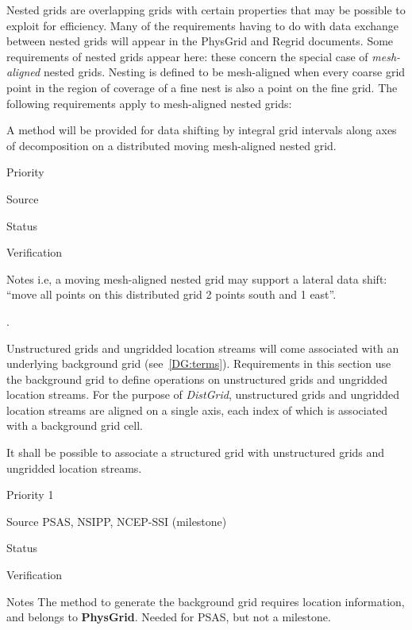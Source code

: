 
Nested grids are overlapping grids with certain properties that may be
possible to exploit for efficiency. Many of the requirements having to
do with data exchange between nested grids will appear in the PhysGrid
and Regrid documents. Some requirements of nested grids appear here:
these concern the special case of \emph{mesh-aligned} nested
grids. Nesting is defined to be mesh-aligned when every coarse grid
point in the region of coverage of a fine nest is also a point on the
fine grid. The following requirements apply to mesh-aligned nested
grids:


A method will be provided for data shifting by integral grid intervals
along axes of decomposition on a distributed moving mesh-aligned
nested grid.

\begin{reqlist}
\item[Priority]
\item[Source]
\item[Status]
\item[Verification]
\item[Notes] i.e, a moving mesh-aligned nested grid may support a
  lateral data shift: ``move all points on this distributed grid 2
  points south and 1 east''.
\end{reqlist}

 \label{DG:Unstructured}.

Unstructured grids and ungridded location streams will come associated
with an underlying background grid (see~\ref{DG:terms}). Requirements
in this section use the background grid to define operations on
unstructured grids and ungridded location streams. For the purpose of
\emph{DistGrid}, unstructured grids and ungridded location streams are
aligned on a single axis, each index of which is associated with a
background grid cell.


It shall be possible to associate a structured grid with unstructured
grids and ungridded location streams.

\begin{reqlist}
\item[Priority] 1
\item[Source] PSAS, NSIPP, NCEP-SSI (milestone)
\item[Status]
\item[Verification]
\item[Notes] The method to generate the background grid requires
  location information, and belongs to \textbf{PhysGrid}.  Needed
  for PSAS, but not a milestone.
\end{reqlist}

